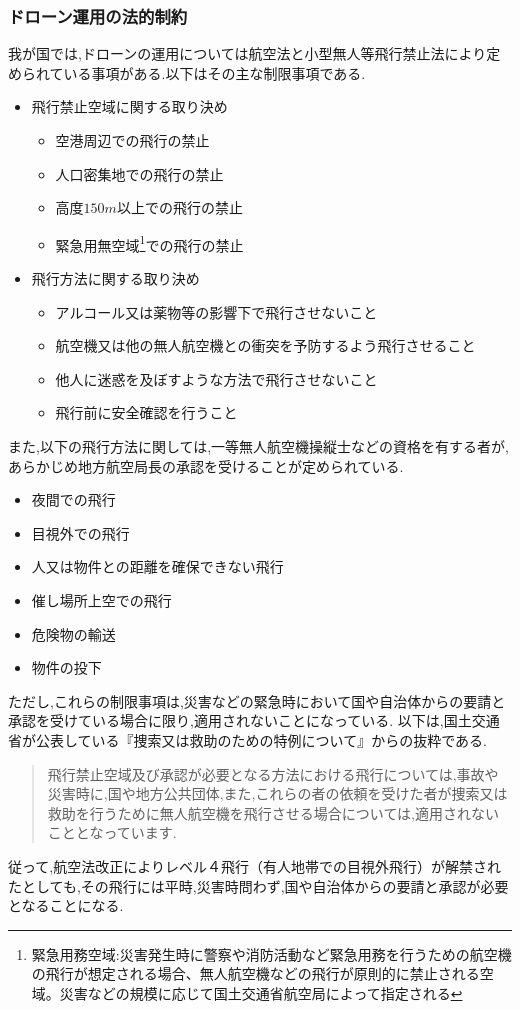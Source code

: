 \documentclass{article}[jsarticle]
\begin{document}
\subsubsection{ドローン運用の法的制約}
我が国では,ドローンの運用については航空法と小型無人等飛行禁止法により定められている事項がある.以下はその主な制限事項である.
\begin{itemize}
    \item 飛行禁止空域に関する取り決め
    \begin{itemize}
        \item 空港周辺での飛行の禁止
        \item 人口密集地での飛行の禁止
        \item 高度$150m$以上での飛行の禁止
        \item 緊急用無空域\footnote{緊急用務空域:災害発生時に警察や消防活動など緊急用務を行うための航空機の飛行が想定される場合、無人航空機などの飛行が原則的に禁止される空域。災害などの規模に応じて国土交通省航空局によって指定される}での飛行の禁止
    \end{itemize}
    \item 飛行方法に関する取り決め
    \begin{itemize}
        \item アルコール又は薬物等の影響下で飛行させないこと
        \item 航空機又は他の無人航空機との衝突を予防するよう飛行させること
        \item 他人に迷惑を及ぼすような方法で飛行させないこと
        \item 飛行前に安全確認を行うこと 
    \end{itemize}
\end{itemize}
また,以下の飛行方法に関しては,一等無人航空機操縦士などの資格を有する者が,あらかじめ地方航空局長の承認を受けることが定められている.
\begin{itemize}
    \item 夜間での飛行
    \item 目視外での飛行
    \item 人又は物件との距離を確保できない飛行
    \item 催し場所上空での飛行
    \item 危険物の輸送
    \item 物件の投下
\end{itemize}
ただし,これらの制限事項は,災害などの緊急時において国や自治体からの要請と承認を受けている場合に限り,適用されないことになっている.
以下は,国土交通省が公表している『捜索又は救助のための特例について』からの抜粋である.
\begin{quote}
    飛行禁止空域及び承認が必要となる方法における飛行については,事故や災害時に,国や地方公共団体,また,これらの者の依頼を受けた者が捜索又は救助を行うために無人航空機を飛行させる場合については,適用されないこととなっています.
\end{quote}
従って,航空法改正によりレベル４飛行（有人地帯での目視外飛行）が解禁されたとしても,その飛行には平時,災害時問わず,国や自治体からの要請と承認が必要となることになる.
\end{document}
